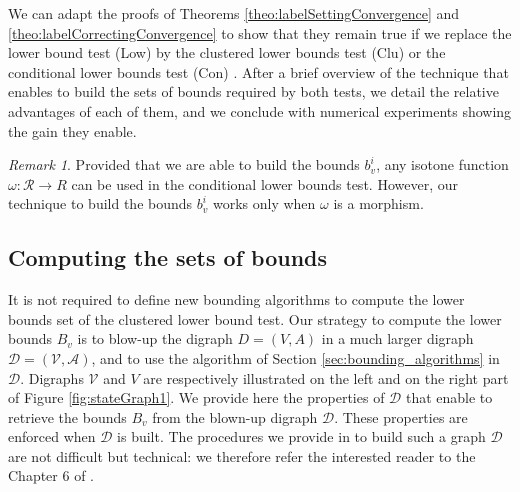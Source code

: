 \documentclass[11pt]{amsart}
\theoremstyle{plain}
\theoremstyle{remark}
\newtheorem{rem}{Remark}
\newcommand{\rset}{\mathcal{R}}
\begin{document}
We can adapt the proofs of Theorems \ref{theo:labelSettingConvergence} and \ref{theo:labelCorrectingConvergence} to show that they remain true if we replace the lower bound test (Low) by the clustered lower bounds test (Clu) or the conditional lower bounds test (Con) \cite{parmentier2016thesis}.  After a brief overview of the technique that enables to build the sets of bounds required by both tests, we detail the relative advantages of each of them, and we conclude with numerical experiments showing the gain they enable.

\begin{rem}
Provided that we are able to build the bounds $b_{v}^{i}$, any isotone function $\omega : \rset \rightarrow R$ can be used in the conditional lower bounds test. However, our technique to build the bounds  $b_{v}^{i}$ works only when $\omega$ is a morphism.
\end{rem}

\subsection{Computing the sets of bounds} \label{sub:computing_the_set_of_bounds}





It is not required to define new bounding algorithms to compute the lower bounds set of the clustered lower bound test. Our strategy to compute the lower bounds $B_{v}$ is to blow-up the  digraph $D = (V,A)$ in a much larger digraph $\mathcal{D} = (\mathcal{V},\mathcal{A})$, and to use the algorithm of Section \ref{sec:bounding_algorithms} in $\mathcal{D}$.  Digraphs $\mathcal{V}$ and $V$ are respectively illustrated on the left and on the right part of Figure \ref{fig:stateGraph1}. We provide here the properties of $\mathcal{D}$ that enable to retrieve the bounds $B_{v}$ from the blown-up digraph $\mathcal{D}$. These properties are enforced when $\mathcal{D}$ is built. The procedures we provide in \cite{parmentier2016thesis} to build such a graph $\mathcal{D}$ are not difficult but technical: we therefore refer the interested reader to the Chapter 6 of \cite{parmentier2016thesis}.
\end{document}
